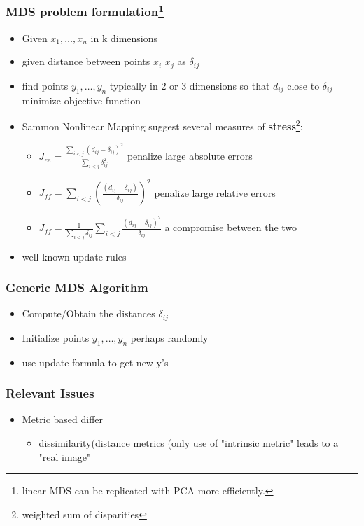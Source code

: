 \documentclass{beamer}
\begin{document}
    \begin{frame}
      \frametitle{MDS problem formulation\footnote{linear MDS can be replicated with PCA more efficiently.}}
      \begin{itemize}
      \item Given $x_1, \ldots , x_n$ in k dimensions
      \item given distance between points $x_i$ $x_j$ as $\delta_{ij}$
        
      \item find points $y_1, \ldots , y_n$ typically in 2 or 3 dimensions so that $d_{ij}$ close to $\delta_{ij}$ minimize objective function
      \item Sammon Nonlinear Mapping suggest several measures of {\bf stress}\footnote{weighted sum of disparities}:
        
        \begin{itemize}
        \item $J_{ee}= \frac{\sum_{i<j}(d_{ij}-\delta_{ij})^2}{\sum_{i<j}\delta_{ij}^2}$ penalize large absolute errors
        \item $J_{ff}= \sum_{i<j}\left ( \frac{(d_{ij}-\delta_{ij})}{\delta_{ij}} \right )^2$ penalize large relative errors
        \item $J_{ff}= \frac{1}{\sum_{i<j}\delta_{ij}}\sum_{i<j}\frac{(d_{ij}-\delta_{ij})^2}{\delta_{ij}} $ a compromise between the two
        \end{itemize}
      \item well known update rules
      \end{itemize}
    \end{frame}
    \begin{frame}
      \frametitle{Generic MDS Algorithm}
      \begin{itemize}
      \item Compute/Obtain the distances $\delta_{ij}$
      \item Initialize points $y_1, \ldots, y_n$ perhaps randomly
      \item use update formula to get new y's  
      \end{itemize}
    \end{frame}
    \begin{frame}
      \frametitle{Relevant Issues}
      \begin{itemize}
      \item Metric based differ
        \begin{itemize}
        \item dissimilarity(distance metrics  (only use of "intrinsic metric" leads to a "real image"
        \end{itemize}

      \end{itemize}
    \end{frame}
\end{document}
